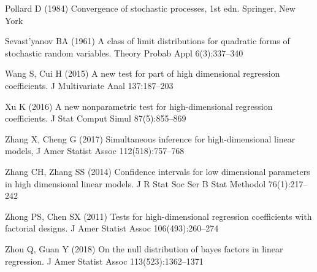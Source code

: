 \documentclass[smallextended]{svjour3}       %
\begin{document}
\begin{thebibliography}{}
Pollard D (1984) Convergence of stochastic processes, 1st edn. Springer, New
  York

Sevast'yanov BA (1961) A class of limit distributions for quadratic forms of
  stochastic random variables. Theory Probab Appl
  6(3):337--340




Wang S, Cui H (2015) A new test for part of high dimensional regression
  coefficients. J Multivariate Anal 137:187--203

Xu K (2016) A new nonparametric test for high-dimensional regression
  coefficients. J Stat Comput Simul
  87(5):855--869

    Zhang X, Cheng G (2017) Simultaneous inference for high-dimensional linear models, J Amer Statist Assoc
    112(518):757--768

Zhang CH, Zhang SS (2014) Confidence intervals for low dimensional parameters
  in high dimensional linear models. J R Stat Soc Ser B Stat Methodol 76(1):217--242

Zhong PS, Chen SX (2011) Tests for high-dimensional regression coefficients
  with factorial designs. J Amer Statist Assoc
  106(493):260--274

Zhou Q, Guan Y (2018) On the null distribution of bayes factors in linear
  regression. J Amer Statist Assoc
  113(523):1362--1371
\end{thebibliography}
\end{document}
